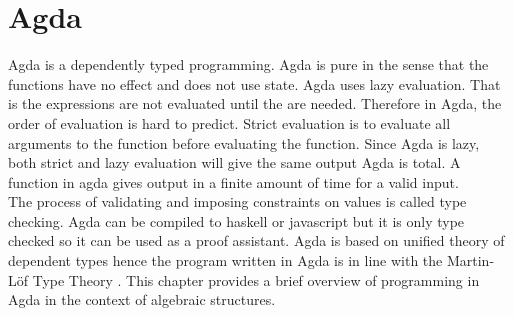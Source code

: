 \chapter{Agda}
Agda is a dependently typed programming. Agda is pure in the sense that the functions have no effect and does not use state. Agda uses lazy evaluation. That is the expressions are not evaluated until the are needed. Therefore in Agda, the order of evaluation is hard to predict. Strict evaluation is to evaluate all arguments to the function before evaluating the function. Since Agda is lazy, both strict and lazy evaluation will give the same output \cite{kidney2020finiteness} Agda is total. A function in agda gives output in a finite amount of time for a valid input.\\
The process of validating and imposing constraints on values is called type checking. Agda can be compiled to haskell or javascript but it is only type checked so it can be used as a proof assistant. Agda is based on unified theory of dependent types \cite{enwiki:1127496533} hence the program written in Agda is in line with the Martin-Löf Type Theory \cite{kidney2020finiteness}. This chapter provides a brief overview of programming in Agda in the context of algebraic structures. 

